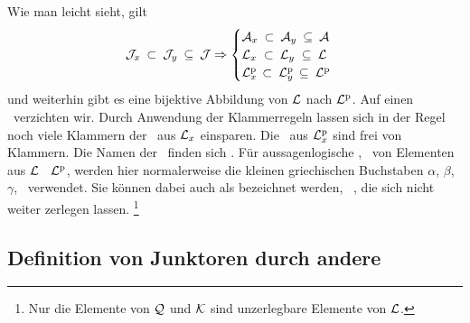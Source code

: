 Wie man leicht sieht, gilt
\begin{equation}
	\mathcal{J}_x      \: \subset \: \mathcal{J}_y  \: \subseteq \: \mathcal{J} \Rightarrow
	\begin{cases}
		\mathcal{A}_x  \: \subset \: \mathcal{A}_y  \: \subseteq \: \mathcal{A} \\
		\mathcal{L}_x  \; \subset \: \mathcal{L}_y  \; \subseteq \: \mathcal{L} \\
		\mathcal{L}^\mathrm{p}_x \, \subset \: \mathcal{L}^\mathrm{p}_y \, \subseteq \: \mathcal{L}^\mathrm{p}
	\end{cases}
\end{equation}
und weiterhin gibt es eine bijektive Abbildung von $\mathcal{L}$ nach $\mathcal{L}^\mathrm{p}$. Auf einen \Beweis\ verzichten wir.
%
Durch Anwendung der Klammerregeln  lassen sich in der Regel noch viele Klammern der \Formeln\ aus $\mathcal{L}_x$ einsparen.
Die \Formeln\ aus $\mathcal{L}^\mathrm{p}_x$ sind frei von Klammern.
Die Namen der \Junktoren\ finden sich .
Für aussagenlogische \Formeln, \textdh\ von Elementen aus $\mathcal{L}$ \textbzgl\ $\mathcal{L}^\mathrm{p}$, werden hier normalerweise die kleinen griechischen Buchstaben $\alpha$, $\beta$, $\gamma$, \textusw\ verwendet.
Sie können dabei auch als  bezeichnet werden, \textdh\ \Formeln, die sich nicht weiter zerlegen lassen.%
\footnote{%
	Nur die Elemente von $\mathcal{Q}$ und $\mathcal{K}$ sind unzerlegbare Elemente von $\mathcal{L}$.
}

\subsection{Definition von Junktoren durch andere}%
\label{sub:ausOperatorDef}
\hidden{\Junktor}

